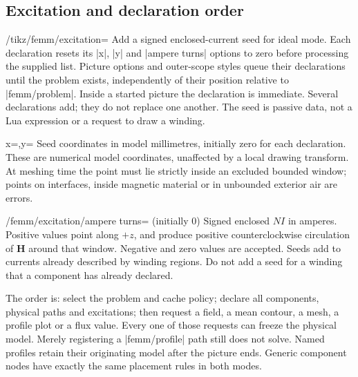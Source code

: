 \subsection{Excitation and declaration order}
\begin{key}{/tikz/femm/excitation=}
Add a signed enclosed-current seed for ideal mode. Each declaration resets its
|x|, |y| and |ampere turns| options to zero before processing the supplied list.
Picture options and outer-scope styles queue their declarations until the
problem exists, independently of their position relative to |femm/problem|.
Inside a started picture the declaration is immediate. Several declarations
add; they do not replace one another. The seed is passive data, not a Lua
expression or a request to draw a winding.
\end{key}
\begin{keylist}{x=,y=}
Seed coordinates in model millimetres, initially zero for each declaration.
These are numerical model coordinates, unaffected by a local drawing transform.
At meshing time the point must lie strictly inside an excluded bounded window;
points on interfaces, inside magnetic material or in unbounded exterior air
are errors.
\end{keylist}
\begin{key}{/femm/excitation/ampere turns= (initially 0)}
Signed enclosed $NI$ in amperes. Positive values point along $+z$, and produce
positive counterclockwise circulation of $\mathbf H$ around that window.
Negative and zero values are accepted. Seeds add to currents already described
by winding regions. Do not add a seed for a winding that a component has
already declared.
\end{key}

The order is: select the problem and cache policy; declare all components,
physical paths and excitations; then request a field, a mean contour, a mesh,
a profile plot or a flux value. Every one of those requests can freeze the
physical model. Merely registering a |femm/profile| path still does not solve.
Named profiles retain their originating model after the picture ends.
Generic component nodes have exactly the same placement rules in both modes.

